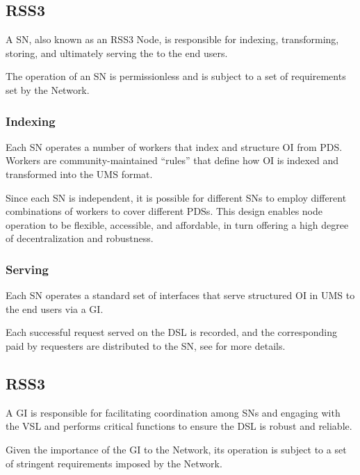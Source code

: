 \subsection{RSS3 }
\label{subsec:SN}

A \gls{SN}, also known as an RSS3 Node, is responsible for indexing, transforming, storing, and ultimately serving the  to the end users.

The operation of an \gls{SN} is permissionless and is subject to a set of requirements set by the Network.

\subsubsection{Indexing}
Each \gls{SN} operates a number of workers that index and structure \gls{OI} from \gls{PDS}.
Workers are community-maintained ``rules'' that define how \gls{OI} is indexed and transformed into the \gls{UMS} format.

Since each \gls{SN} is independent, it is possible for different \glspl{SN} to employ different combinations of workers to cover different \glspl{PDS}.
This design enables node operation to be flexible, accessible, and affordable, in turn offering a high degree of decentralization and robustness.

\subsubsection{Serving}
Each \gls{SN} operates a standard set of interfaces that serve structured \gls{OI} in \gls{UMS} to the end users via a \gls{GI}.

Each successful request served on the \gls{DSL} is recorded, and the corresponding  paid by requesters are distributed to the \gls{SN}, see  for more details.

\subsection{RSS3 }
\label{subsec:GI}

A \gls{GI} is responsible for facilitating coordination among \glspl{SN} and engaging with the \gls{VSL} and performs critical functions to ensure the \gls{DSL} is robust and reliable.

Given the importance of the \gls{GI} to the Network, its operation is subject to a set of stringent requirements imposed by the Network.

